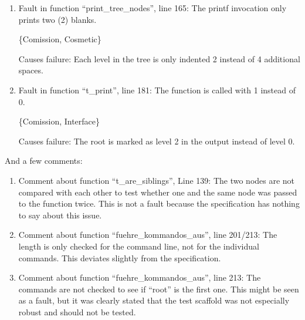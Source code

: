 \begin{enumerate}
% 
% 
% 
% 

\item Fault in function ``print\_tree\_nodes'', line 165:
The printf invocation only prints two (2) blanks.

\{Comission, Cosmetic\}

Causes failure:  Each level in the tree is only indented 2 instead 
of 4 additional spaces. 

\item Fault in function ``t\_print'', line 181:
The function is called with 1 instead of 0.

\{Comission, Interface\}

Causes failure:  The root is marked as level 2 in the output instead
of level 0.

\end{enumerate}

And a few comments:

\begin{enumerate}

\item Comment about function ``t\_are\_siblings'', Line 139:  The two
nodes are not compared with each other to test whether one and the
same node was passed to the function twice.  This is not a fault
because the specification has nothing to say about this issue.

\item Comment about function ``fuehre\_kommandos\_aus'', line 201/213: 
The length is only checked for the command line, not for the
individual commands.  This deviates slightly from the specification.

\item Comment about function ``fuehre\_kommandos\_aus'', line 213:
The commands are not checked to see if ``root'' is the first one.
This might be seen as a fault, but it was clearly stated that the test
scaffold was not especially robust and should not be tested.

\end{enumerate}

